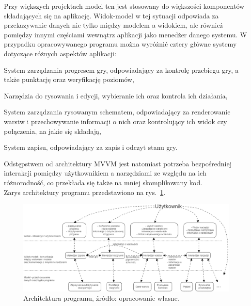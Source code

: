 Przy większych projektach model ten jest stosowany do większości komponentów składających się na aplikację.
Widok-model w tej sytuacji odpowiada za przekazywanie danych nie tylko między modelem a widokiem,
ale również pomiędzy innymi częściami wewnątrz aplikacji jako menedżer danego systemu.
W przypadku opracowywanego programu można wyróżnić cztery główne systemy dotyczące różnych aspektów aplikacji:

\begin{citemize}
    \item System zarządzania progresem gry, odpowiadający za kontrolę przebiegu gry,
    a także punktację oraz weryfikację poziomów,
    \item Narzędzia do rysowania i edycji, wybieranie ich oraz kontrola ich działania,
    \item System zarządzania rysowanym schematem,
    odpowiadający za renderowanie warstw i przechowywanie informacji o nich
    oraz kontrolujący ich widok czy połączenia, na jakie się składają,
    \item System zapisu, odpowiadający za zapis i odczyt stanu gry.
\end{citemize}

Odstępstwem od architektury MVVM jest natomiast potrzeba bezpośredniej interakcji pomiędzy użytkownikiem
a narzędziami ze względu na ich różnorodność, co przekłada się także na mniej skomplikowany kod.\\
Zarys architektury programu przedstawiono na rys.~\ref{fig:architektura}.

\begin{figure}[h!]
    \centering
    \includegraphics[width=\textwidth]{chapters/chapter3/rys/arch}
    \caption[Architektura programu.]{Architektura programu, źródło: opracowanie własne.}
    \label{fig:architektura}
\end{figure}

